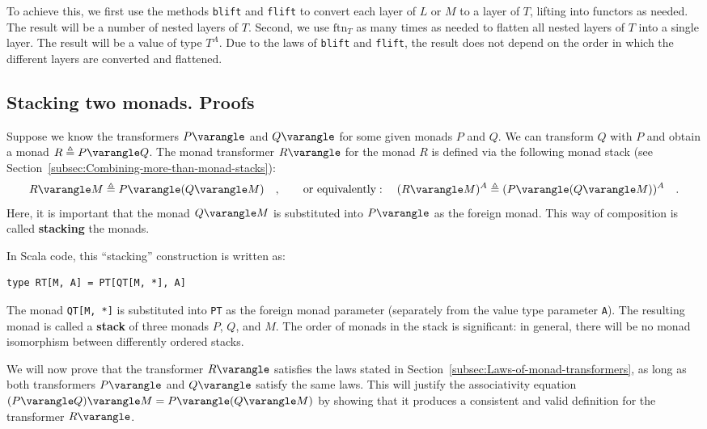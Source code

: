 To achieve this, we first use the methods \lstinline!blift! and \lstinline!flift!
to convert each layer of $L$ or $M$ to a layer of $T$, lifting
into functors as needed. The result will be a number of nested layers
of $T$. Second, we use $\text{ftn}_{T}$ as many times as needed
to flatten all nested layers of $T$ into a single layer. The result
will be a value of type $T^{A}$. Due to the laws of \lstinline!blift!
and \lstinline!flift!, the result does not depend on the order in
which the different layers are converted and flattened.

\subsection{Stacking two monads. Proofs\label{subsec:Stacking-two-monads}}

Suppose we know the transformers $P\varangle$ and $Q\varangle$ for
some given monads $P$ and $Q$. We can transform $Q$ with $P$ and
obtain a monad $R\triangleq P\varangle Q$. The monad transformer
$R\varangle$ for the monad $R$ is defined via the following monad
stack (see Section~\ref{subsec:Combining-more-than-monad-stacks}):
\[
R\varangle M\triangleq P\varangle(Q\varangle M)\quad,\quad\quad\text{or equivalently}:\quad(R\varangle M)^{A}\triangleq(P\varangle(Q\varangle M))^{A}\quad.
\]
Here, it is important that the monad $Q\varangle M$ is substituted
into $P\varangle$ as the foreign monad. This way of composition is
called \textbf{stacking} the monads. 

In Scala code, this \textsf{``}stacking\textsf{''} construction is written as:
\begin{lstlisting}
type RT[M, A] = PT[QT[M, *], A]
\end{lstlisting}
The monad \lstinline!QT[M, *]! is substituted into \lstinline!PT!
as the foreign monad parameter (separately from the value type parameter
\lstinline!A!). The resulting monad is called a \textbf{stack}
of three monads $P$, $Q$, and $M$. The order of monads in the stack
is significant: in general, there will be no monad isomorphism between
differently ordered stacks.

We will now prove that the transformer $R\varangle$ satisfies the
laws stated in Section~\ref{subsec:Laws-of-monad-transformers},
as long as both transformers $P\varangle$ and $Q\varangle$ satisfy
the same laws. This will justify the associativity equation $(P\varangle Q)\varangle M=P\varangle(Q\varangle M)$
by showing that it produces a consistent and valid definition for
the transformer $R\varangle$.

